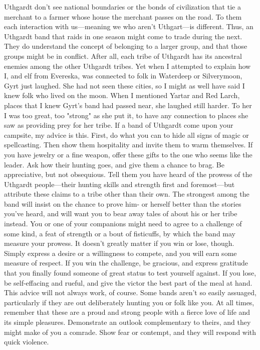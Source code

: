 \documentclass[10pt,a4paper,twoside,twocolumn,openany,bg=print,nodeprecatedcode]{dndbook}
\begin{document}
Uthgardt don't see national boundaries or the bonds of civilization that tie a merchant to a farmer whose house the merchant passes on the road. To them each interaction with us—meaning we who aren't Uthgart—is different. Thus, an Uthgardt band that raids in one season might come to trade during the next. They do understand the concept of belonging to a larger group, and that those groups might be in conflict. After all, each tribe of Uthgardt has its ancestral enemies among the other Uthgardt tribes. Yet when I attempted to explain how I, and elf from Evereska, was connected to folk in Waterdeep or Silverymoon, Gyrt just laughed. She had not seen these cities, so I might as well have said I knew folk who lived on the moon. When I mentioned Yartar and Red Larch, places that I knew Gyrt's band had passed near, she laughed still harder. To her I was too great, too "strong" as she put it, to have any connection to places she saw as providing prey for her tribe.
If a band of Uthgardt come upon your campsite, my advice is this. First, do what you can to hide all signs of magic or spellcasting. Then show them hospitality and invite them to warm themselves. If you have jewelry or a fine weapon, offer these gifts to the one who seems like the leader. Ask how their hunting goes, and give them a chance to brag. Be appreciative, but not obsequious. Tell them you have heard of the prowess of the Uthgardt people—their hunting skills and strength first and foremost—but attribute these claims to a tribe other than their own. The strongest among the band will insist on the chance to prove him- or herself better than the stories you've heard, and will want you to bear away tales of about his or her tribe instead.
You or one of your companions might need to agree to a challenge of some kind, a feat of strength or a bout of fisticuffs, by which the band may measure your prowess. It doesn't greatly matter if you win or lose, though. Simply express a desire or a willingness to compete, and you will earn some measure of respect. If you win the challenge, be gracious, and express gratitude that you finally found someone of great status to test yourself against. If you lose, be self-effacing and rueful, and give the victor the best part of the meal at hand.
This advice will not always work, of course. Some bands aren't so easily assuaged, particularly if they are out deliberately hunting you or folk like you. At all times, remember that these are a proud and strong people with a fierce love of life and its simple pleasures. Demonstrate an outlook complementary to theirs, and they might make of you a comrade. Show fear or contempt, and they will respond with quick violence.
\end{document}

